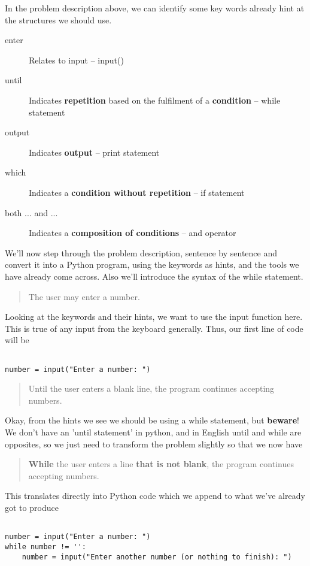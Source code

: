 In the problem description above, we can identify some key words   already hint at the structures we should use.
\begin{description}
	\item[enter] Relates to input -- input()
	\item[until] Indicates \textbf{repetition} based on the fulfilment    of a \textbf{condition} -- while statement
	\item[output] Indicates \textbf{output} -- print statement
	\item[which] Indicates a \textbf{condition without repetition} -- if    statement
	\item[both ... and ...] Indicates a \textbf{composition of conditions} -- and    operator
\end{description}

We'll now step through the problem description, sentence by sentence   and convert it into a Python program, using the keywords as hints, and   the tools we have already come across. Also we'll introduce the syntax   of the while statement.
\begin{quotation}    The user may enter a number.   
\end{quotation}

Looking at the keywords and their hints, we want to use the   input function here. This is true of any input from the keyboard generally.   Thus, our first line of code will be
\begin{lstlisting}

number = input("Enter a number: ")
\end{lstlisting}
\begin{quotation}    Until the user enters a blank line, the program continues accepting numbers.   
\end{quotation}

Okay, from the hints we see we should be using a while statement,   but \textbf{beware}! We don't have an 'until statement' in   python, and in English until and while are opposites, so we just need   to transform the problem slightly so that we now have
\begin{quotation}\textbf{While} the user enters a line \textbf{that is not    blank}, the program continues accepting numbers.    
\end{quotation}

This translates directly into Python code which we append to what   we've already got to produce
\begin{lstlisting}

number = input("Enter a number: ")
while number != '':
    number = input("Enter another number (or nothing to finish): ")
\end{lstlisting}

